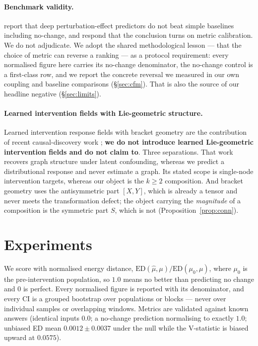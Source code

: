 \documentclass{article}
\newcommand{\ED}{\mathrm{ED}}
\begin{document}
\paragraph{Benchmark validity.} \citet{ahlmanneltze2025linear} report that deep
perturbation-effect predictors do not beat simple baselines including no-change, and
\citet{miller2025rebuttal} respond that the conclusion turns on metric calibration. We do
not adjudicate. We adopt the shared methodological lesson --- that the choice of metric can
reverse a ranking --- as a protocol requirement: every normalised figure here carries its
no-change denominator, the no-change control is a first-class row, and we report the
concrete reversal we measured in our own coupling and baseline comparisons
(\S\ref{sec:cfm}). That is also the source of our headline negative
(\S\ref{sec:limits}).

\paragraph{Learned intervention fields with Lie-geometric structure.} Learned intervention
response fields with bracket geometry are the contribution of recent causal-discovery work
\citep{mahadevan2026bridge}; \textbf{we do not introduce learned Lie-geometric intervention
fields and do not claim to}. Three separations. That work recovers graph structure under
latent confounding, whereas we predict a distributional response and never estimate a graph.
Its stated scope is single-node intervention targets, whereas our object is the $k \ge 2$
composition. And bracket geometry uses the antisymmetric part $[X,Y]$, which is already a
tensor and never meets the transformation defect; the object carrying the \emph{magnitude} of
a composition is the symmetric part $S$, which is not (Proposition~\ref{prop:conn}).

\section{Experiments}
\label{sec:exp}

We score with normalised energy distance,
$\ED(\hat\mu, \mu)/\ED(\mu_{0}, \mu)$, where $\mu_{0}$ is the pre-intervention population, so
$1.0$ means no better than predicting no change and $0$ is perfect. Every normalised figure
is reported with its denominator, and every CI is a grouped bootstrap over populations or
blocks --- never over individual samples or overlapping windows. Metrics are validated
against known answers (identical inputs $0.0$; a no-change prediction normalising to exactly
$1.0$; unbiased ED mean $0.0012 \pm 0.0037$ under the null while the V-statistic is biased
upward at $0.0575$).
\end{document}
